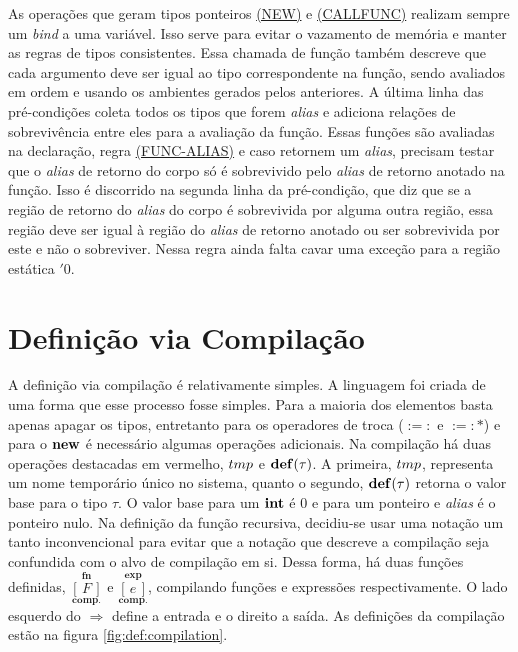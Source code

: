 As operações que geram tipos ponteiros \hyperref[trule:new]{(NEW)} e \hyperref[trule:callfunc]{(CALLFUNC)} realizam sempre um \emph{bind} a uma variável. Isso serve para evitar o vazamento de memória e manter as regras de tipos consistentes. Essa chamada de função também descreve que cada argumento deve ser igual ao tipo correspondente na função, sendo avaliados em ordem e usando os ambientes gerados pelos anteriores. A última linha das pré-condições coleta todos os tipos que forem \emph{alias} e adiciona relações de sobrevivência entre eles para a avaliação da função. Essas funções são avaliadas na declaração, regra \hyperref[trule:func-alias]{(FUNC-ALIAS)} e caso retornem um \emph{alias}, precisam testar que o \emph{alias} de retorno do corpo só é sobrevivido pelo \emph{alias} de retorno anotado na função. Isso é discorrido na segunda linha da pré-condição, que diz que se a região de retorno do \emph{alias} do corpo é sobrevivida por alguma outra região, essa região deve ser igual à região do \emph{alias} de retorno anotado ou ser sobrevivida por este e não o sobreviver. Nessa regra ainda falta cavar uma exceção para a região estática $'0$.

\section{Definição via Compilação}
\label{chap5:compile}

\newcommand{\compf}[1]{\overset{\mathbf{fn}}{\underset{\mathbf{comp.}}{[\,#1\,]}}}
\newcommand{\compe}[1]{\overset{\mathbf{exp}}{\underset{\mathbf{comp.}}{[\,#1\,]}}}
\newcommand{\TMP}{{\color{red}tmp}}
\newcommand{\DEF}{{\color{red}\mathbf{def}({\color{black}\tau})}}

A definição via compilação é relativamente simples. A linguagem foi criada de uma forma que esse processo fosse simples. Para a maioria dos elementos basta apenas apagar os tipos, entretanto para os operadores de troca ($:=:$ e $:=:\!\!\text{*}$) e para o $\mathbf{new}$ é necessário algumas operações adicionais. Na compilação há duas operações destacadas em vermelho, $\TMP$ e $\DEF$. A primeira, $\TMP$, representa um nome temporário único no sistema, quanto o segundo, $\DEF$ retorna o valor base para o tipo $\tau$. O valor base para um $\mathbf{int}$ é 0 e para um ponteiro e \emph{alias} é o ponteiro nulo. Na definição da função recursiva, decidiu-se usar uma notação um tanto inconvencional para evitar que a notação que descreve a compilação seja confundida com o alvo de compilação em si. Dessa forma, há duas funções definidas, $\compf{F}$ e $\compe{e}$, compilando funções e expressões respectivamente. O lado esquerdo do $\Rightarrow$ define a entrada e o direito a saída. As definições da compilação estão na figura \ref{fig:def:compilation}.

